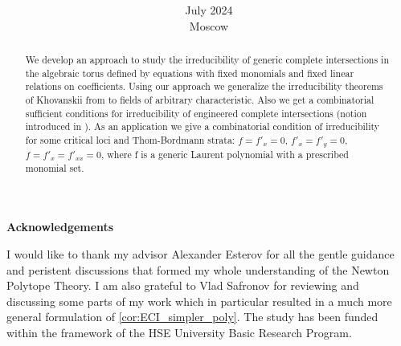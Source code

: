 \documentclass[12pt]{article}
\title{
  \sc{Irreducibility of Toric Complete Intersections}
  }
\author{
  \sc{Andrey Zhizhin\thanks{National Research University Higher School of Economics, Russian Federation}}
  }
\date{July 2024\\
Moscow}
\theoremstyle{definition}
\theoremstyle{plain}
\begin{document}
\maketitle


\begin{abstract}    
    We develop an approach to study the irreducibility of generic complete intersections in the algebraic torus defined by equations with fixed monomials and fixed linear relations on coefficients. Using our approach we generalize the irreducibility theorems of Khovanskii from \cite{Khovanskii2016} to fields of arbitrary characteristic. Also we get a combinatorial sufficient conditions for irreducibility of engineered complete intersections (notion introduced in \cite{Esterov2024}). As an application we give a combinatorial condition of irreducibility for some critical loci and Thom-Bordmann strata:  $f = f'_x = 0$, $f'_x = f'_y = 0$, $f = f'_x = f'_{xx} = 0$, where f is a generic Laurent polynomial with a prescribed monomial set.
\end{abstract}
\pagebreak

\begin{center}
    {\bfseries Acknowledgements} 
\end{center}
I would like to thank my advisor Alexander Esterov for all the gentle guidance and peristent discussions that formed my whole understanding of the Newton Polytope Theory. I am also grateful to Vlad Safronov for reviewing and discussing some parts of my work which in particular resulted in a much more general formulation of \autoref{cor:ECI_simpler_poly}.
The study has been funded within the framework of the HSE University Basic Research Program.

\tableofcontents





%




\end{document}
